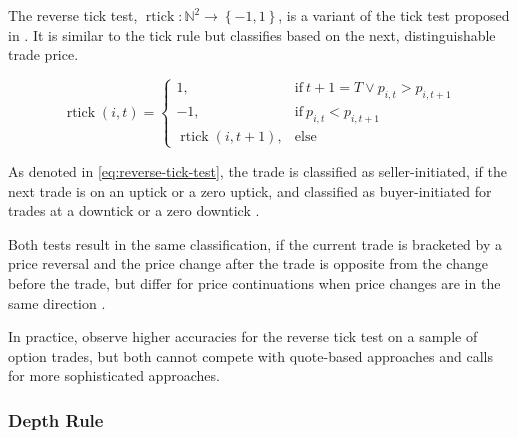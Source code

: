 The reverse tick test, $\operatorname{rtick} \colon \mathbb{N}^2 \to \left\{-1, 1\right\}$, is a variant of the tick test proposed in \textcite[][241]{hasbrouckTradesQuotesInventories1988}. It is similar to the tick rule but classifies based on the next, distinguishable trade price.

\begin{equation}
\operatorname{rtick}(i, t)=
\begin{cases}
1,& \text{if}\ t+1=T \lor p_{i, t} > p_{i, t+1} \\
-1,  & \text{if}\ p_{i, t} < p_{i, t+1}\\
\operatorname{rtick}(i, t+1), & \text{else}
\end{cases}
\label{eq:reverse-tick-test}
\end{equation}

As denoted in \cref{eq:reverse-tick-test}, the trade is classified as seller-initiated, if the next trade is on an uptick or a zero uptick, and classified as buyer-initiated for trades at a downtick or a zero downtick \autocite[][735--636]{leeInferringTradeDirection1991}.

Both tests result in the same classification, if the current trade is bracketed by a price reversal and the price change after the trade is opposite from the change before the trade, but differ for price continuations when price changes are in the same direction \autocite[][736]{leeInferringTradeDirection1991}.

In practice, \textcite[][29--32]{grauerOptionTradeClassification2022} observe higher accuracies for the reverse tick test on a sample of option trades, but both cannot compete with quote-based approaches and calls for more sophisticated approaches.

\subsubsection{Depth Rule}\label{sec:depth-rule}


